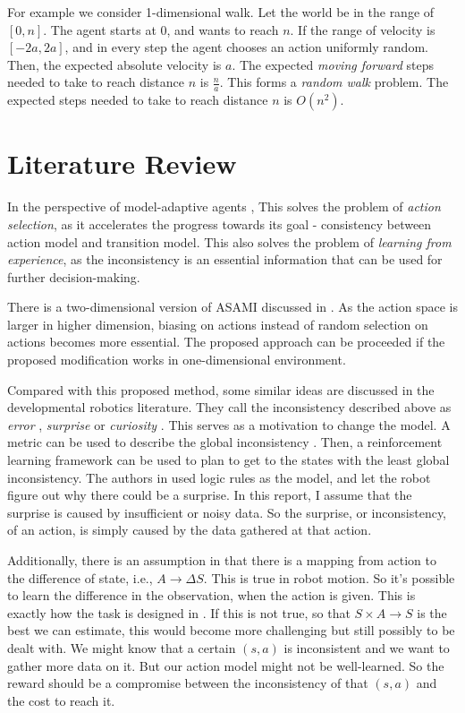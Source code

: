 \documentclass[10pt]{IEEEtran}
\begin{document}
For example we consider 1-dimensional walk. Let the world be in the
range of $[0,n]$. The agent starts at 0, and wants to reach $n$. If
the range of velocity is $[-2a, 2a]$, and in every step the agent
chooses an action uniformly random.  Then, the expected absolute
velocity is $a$.  The expected \textit{moving forward} steps needed to
take to reach distance $n$ is $\frac{n}{a}$. This forms a
\textit{random walk} \cite{motwani1995randomized} problem. The
expected steps needed to take to reach distance $n$ is $O(n^2)$.

\section{Literature Review}

In the perspective of model-adaptive agents \cite{maes1993modeling},
This solves the problem of \textit{action selection}, as it
accelerates the progress towards its goal - consistency between action
model and transition model. This also solves the problem of
\textit{learning from experience}, as the inconsistency is an
essential information that can be used for further decision-making.

There is a two-dimensional version of ASAMI discussed in
\cite{ICRA08-stronger}.  As the action space is larger in higher
dimension, biasing on actions instead of random selection on actions
becomes more essential. The proposed approach can be proceeded if the
proposed modification works in one-dimensional environment.

Compared with this proposed method, some similar ideas are discussed
in the developmental robotics literature. They call the inconsistency
described above as \textit{error} \cite{oudeyer2006discovering},
\textit{surprise} \cite{ranasinghe2008surprise} or \textit{curiosity}
\cite{schmidhuber2006developmental}. This serves as a motivation to
change the model. A metric can be used to describe the global
inconsistency \cite{oudeyer2006discovering}. Then, a reinforcement
learning framework can be used to plan to get to the states with the
least global inconsistency. The authors in
\cite{ranasinghe2008surprise} used logic rules as the model, and let
the robot figure out why there could be a surprise. In this report, I
assume that the surprise is caused by insufficient or noisy data. So
the surprise, or inconsistency, of an action, is simply caused by the
data gathered at that action.

Additionally, there is an assumption in \cite{CSJ06} that there is a
mapping from action to the difference of state, i.e., $A \rightarrow
\Delta S$.  This is true in robot motion. So it's possible to learn
the difference in the observation, when the action is given. This is
exactly how the task is designed in \cite{ICDL10-hester}. If this is
not true, so that $S \times A \rightarrow S$ is the best we can
estimate, this would become more challenging but still possibly to be
dealt with. We might know that a certain $(s, a)$ is inconsistent and
we want to gather more data on it. But our action model might not be
well-learned. So the reward should be a compromise between the
inconsistency of that $(s, a)$ and the cost to reach it.
\end{document}
